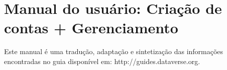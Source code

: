 \documentclass[12pt,hidelinks]{article}
\begin{document}
%        
%        
%        
%        
%        
%        
%    
%    
        
       

        
        \newpage
  
	\vspace{-1.5mm}
\newpage

\section{Manual do usuário: Criação de contas + Gerenciamento}
\vspace{10.5cm}

\qquad Este manual é uma tradução, adaptação e sintetização das informações encontradas no guia disponível em: http://guides.dataverse.org.
\end{document}
